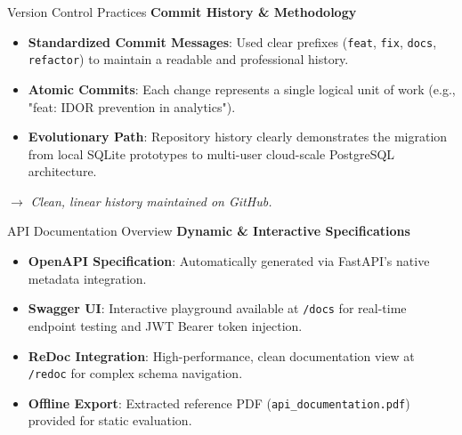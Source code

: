\documentclass[mathserif,aspectratio=169]{beamer}
\begin{document}
\begin{frame}{Version Control Practices}
    \textbf{Commit History \& Methodology}
    \begin{itemize}
        \item \textbf{Standardized Commit Messages}: Used clear prefixes (\texttt{feat}, \texttt{fix}, \texttt{docs}, \texttt{refactor}) to maintain a readable and professional history.
        \item \textbf{Atomic Commits}: Each change represents a single logical unit of work (e.g., "feat: IDOR prevention in analytics").
        \item \textbf{Evolutionary Path}: Repository history clearly demonstrates the migration from local SQLite prototypes to multi-user cloud-scale PostgreSQL architecture.
    \end{itemize}
    \begin{center}
         $\rightarrow$ \textit{Clean, linear history maintained on GitHub.}
    \end{center}
\end{frame}

\begin{frame}{API Documentation Overview}
    \textbf{Dynamic \& Interactive Specifications}
    \begin{itemize}
        \item \textbf{OpenAPI Specification}: Automatically generated via FastAPI's native metadata integration.
        \item \textbf{Swagger UI}: Interactive playground available at \texttt{/docs} for real-time endpoint testing and JWT Bearer token injection.
        \item \textbf{ReDoc Integration}: High-performance, clean documentation view at \texttt{/redoc} for complex schema navigation.
        \item \textbf{Offline Export}: Extracted reference PDF (\texttt{api\_documentation.pdf}) provided for static evaluation.
    \end{itemize}
\end{frame}
\end{document}
